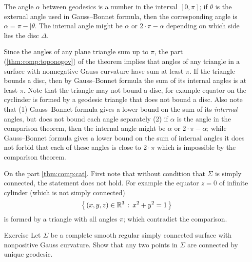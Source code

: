 The angle $\alpha$ between geodesics is a number in the interval $[0,\pi]$;
if $\theta$ is the external angle used in Gauss--Bonnet formula, then the corresponding angle is $\alpha=\pi-|\theta$.
The internal angle might be $\alpha$ or $2\cdot\pi-\alpha$ depending on which side lies the disc $\Delta$.

Since the angles of any plane triangle sum up to $\pi$,
the part (\ref{thm:comp:toponogov}) of the theorem implies that angles of any triangle in a surface with nonnegative Gauss curvature have sum at least $\pi$.
If the triangle bounds a disc, then by Gauss--Bonnet formula the sum of its internal angles is at least $\pi$.
Note that the triangle may not bound a disc, for example equator on the cyclinder is formed by a geodesic triangle that does not bound a disc.
Also note that (1) Gauss--Bonnet formula gives a lower bound on the sum of its \emph{internal} angles, but does not bound each angle separately (2) if $\alpha$ is the angle in the comparison theorem, then the internal angle might be $\alpha$ or $2\cdot\pi-\alpha$; while Gauss--Bonnet formula gives a lower bound on the sum of internal angles it does not forbid that each of these angles is close to $2\cdot \pi$ which is impossible by the comparison theorem.

On the part \ref{thm:comp:cat}.
First note that without condition that $\Sigma$ is simply connected, the statement does not hold.
For example the equator $z=0$ of infinite cylinder (which is not simply connected)
\[\left\{\,{(x,y,z)\in\mathbb{R}^3}\,:\,{x^2+y^2=1}\,\right\}\]
is formed by a triangle with all angles $\pi$; which contradict the comparison.

\begin{thm}{Exercise}
Let $\Sigma$ be a complete smooth regular simply connected surface with nonpositive Gauss curvature.
Show that any two points in $\Sigma$ are connected by unique geodesic.
\end{thm}




